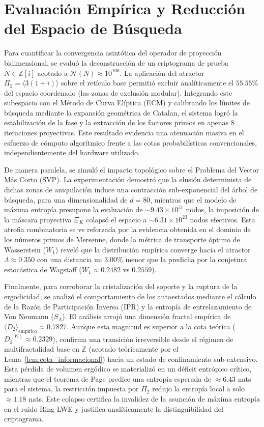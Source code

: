 \documentclass{article}
\numberwithin{equation}{section}
\theoremstyle{plain}
\theoremstyle{definition}
\begin{document}
\section{Evaluación Empírica y Reducción del Espacio de Búsqueda}
\label{sec:resultados}

Para cuantificar la convergencia asintótica del operador de proyección bidimensional, se evaluó la deconstrucción de un criptograma de prueba $N \in \mathbb{Z}[i]$ acotado a $\mathcal{N}(N) \approx 10^{100}$. La aplicación del atractor $\Pi_2 = \langle 3(1+i) \rangle$ sobre el retículo base permitió excluir analíticamente el $55.55\%$ del espacio coordenado (las zonas de exclusión modular). Integrando este subespacio con el Método de Curva Elíptica (ECM) y calibrando los límites de búsqueda mediante la expansión geométrica de Catalan, el sistema logró la estabilización de la fase y la extracción de los factores primos en apenas $8$ iteraciones proyectivas. Este resultado evidencia una atenuación masiva en el esfuerzo de cómputo algorítmico frente a las cotas probabilísticas convencionales, independientemente del hardware utilizado.

De manera paralela, se simuló el impacto topológico sobre el Problema del Vector Más Corto (SVP). La experimentación demostró que la elusión determinista de dichas zonas de aniquilación induce una contracción sub-exponencial del árbol de búsqueda, para una dimensionalidad de $d=80$, mientras que el modelo de máxima entropía presupone la evaluación de $\sim 9.43 \times 10^{51}$ nodos, la imposición de la máscara proyectiva $\Xi_K$ colapsó el espacio a $\sim 6.31 \times 10^{23}$ nodos efectivos. Esta atrofia combinatoria se ve reforzada por la evidencia obtenida en el dominio de los números primos de Mersenne, donde la métrica de transporte óptimo de Wasserstein ($W_1$) reveló que la distribución empírica converge hacia el atractor $\Lambda \approx 0.350$ con una distancia un $3.00\%$ menor que la predicha por la conjetura estocástica de Wagstaff ($W_1 \approx 0.2482$ vs $0.2559$).

Finalmente, para corroborar la cristalización del soporte y la ruptura de la ergodicidad, se analizó el comportamiento de los autoestados mediante el cálculo de la Razón de Participación Inversa (IPR) y la entropía de entrelazamiento de Von Neumann ($S_A$). El análisis arrojó una dimensión fractal empírica de $\langle D_2 \rangle_{\text{empírico}} \approx 0.7827$. Aunque esta magnitud es superior a la cota teórica ($D_2^{(K)} \approx 0.2329$), confirma una transición irreversible desde el régimen de multifractalidad base en $\mathbb{Z}$ (acotado teóricamente por el Lema~\ref{lem:cota_informacional}) hacia un estado de confinamiento sub-extensivo. Esta pérdida de volumen ergódico se materializó en un déficit entrópico crítico, mientras que el teorema de Page predice una entropía esperada de $\approx 6.43$ nats para el sistema, la restricción impuesta por $\Pi_2$ redujo la entropía local a solo $\approx 1.18$ nats. Este colapso certifica la invalidez de la asunción de máxima entropía en el ruido Ring-LWE y justifica analíticamente la distinguibilidad del criptograma.
\end{document}
